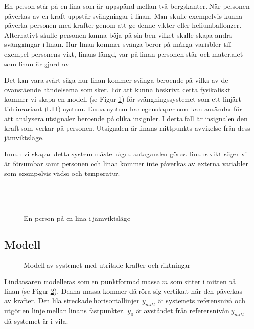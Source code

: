 En person står på en lina som är uppspänd mellan två bergskanter. När personen påverkas av en kraft uppstår svängningar i linan.
Man skulle exempelvis kunna påverka personen med krafter genom att ge denne vikter eller heliumballonger. Alternativt skulle personen kunna böja på sin ben vilket skulle skapa andra svängningar i linan.
Hur linan kommer svänga beror på många variabler till exempel personens vikt, linans längd, var på linan personen står och materialet som linan är gjord av. 

Det kan vara svårt säga hur linan kommer svänga beroende på vilka av de ovanstående händelserna som sker.
För att kunna beskriva detta fysikaliskt kommer vi skapa en modell (se Figur \ref{fig:skiss}) 
för svängningssystemet som ett linjärt tidsinvariant (LTI) system. 
Dessa system har egenskaper som kan användas för att analysera utsignaler beroende på olika insignler. 
I detta fall är insignalen den kraft som verkar på personen.
Utsignalen är linans mittpunkts avvikelse från dess jämviktsläge.

Innan vi skapar detta system måste några antaganden göras: linans vikt säger vi är försumbar samt personen och linan kommer inte påverkas av externa variabler som exempelvis väder och temperatur. 
\\\\\\\\
\begin{figure}[h] %
    \centering
    \scalebox{1.2}{}
    \caption{En person på en lina i jämviktsläge}    
    \label{fig:skiss}
\end{figure}

\newpage\subsection{Modell}

\begin{figure}[h] %
    \centering
    
    \caption{Modell av systemet med utritade krafter och riktningar}
    \label{fig:modell}
\end{figure}

Lindansaren modelleras som en punktformad massa $m$ som sitter i mitten på linan (se Figur \ref{fig:modell}). 
Denna massa kommer då röra sig vertikalt när den påverkas av krafter.
Den lila streckade horisontallinjen $y_{mitt}$ är systemets referensnivå och utgör en linje mellan linans fästpunkter. $y_0$ är avståndet från referensnivån $y_{mitt}$ då systemet är i vila.

